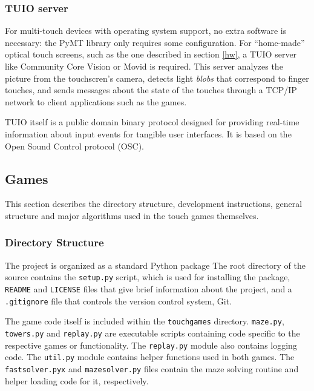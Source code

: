 \documentclass[a4paper,11pt]{article}
\begin{document}
\subsubsection{TUIO server}


For multi-touch devices with operating system support, no extra
software is necessary: the PyMT library only requires some configuration.
For “home-made” optical touch screens, such as the
one described in section \ref{hw}, a TUIO server like Community Core Vision
or Movid is required.
This server analyzes the picture from the touchscren's camera, detects light
\emph{blobs} that correspond to finger touches, and sends messages about the
state of the touches through a TCP/IP network to client applications such as
the games.

TUIO itself is a public domain binary protocol designed for providing real-time
information about input events for tangible user interfaces.
It is based on the Open Sound Control protocol (OSC).

\subsection{Games}

This section describes the directory structure, development instructions,
general structure and major algorithms used in the touch games themselves.

\subsubsection{Directory Structure}

The project is organized as a standard Python package
The root directory of the source contains the \texttt{setup.py} script, which
is used for installing the package, \texttt{README} and \texttt{LICENSE} files
that give brief information about the project, and a \texttt{.gitignore} file
that controls the version control system, Git.

The game code itself is included within the \texttt{touchgames} directory.
\texttt{maze.py}, \texttt{towers.py} and \texttt{replay.py} are executable
scripts containing code specific to the respective games or functionality.
The \texttt{replay.py} module also contains logging code.
The \texttt{util.py} module contains helper functions used in both games.
The \texttt{fastsolver.pyx} and \texttt{mazesolver.py} files contain the maze
solving routine and helper loading code for it, respectively.
\end{document}
